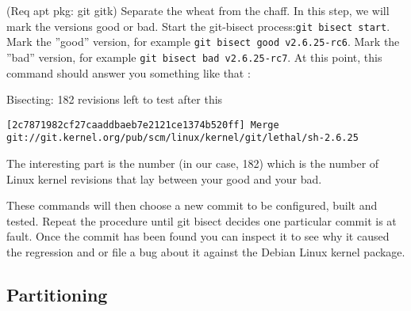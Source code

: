 \begin{itemize}
(Req apt pkg: git gitk)
Separate the wheat from the chaff. In this step, we will mark the versions good or bad.
Start the git-bisect process:\verb=git bisect start=.
Mark the ''good'' version, for example \verb=git bisect good v2.6.25-rc6=.
Mark the ''bad'' version, for example \verb=git bisect bad v2.6.25-rc7=.
At this point, this command should answer you something like that :

Bisecting: 182 revisions left to test after this
\begin{lstlisting}
[2c7871982cf27caaddbaeb7e2121ce1374b520ff] Merge git://git.kernel.org/pub/scm/linux/kernel/git/lethal/sh-2.6.25
\end{lstlisting}
The interesting part is the number (in our case, 182) which is the number of Linux kernel revisions that lay between your good and your bad.

These commands will then choose a new commit to be configured, built and tested. Repeat the procedure until git bisect decides one particular commit is at fault. Once the commit has been found you can inspect it to see why it caused the regression and or file a bug about it against the Debian Linux kernel package.

\end{itemize}

\subsection{Partitioning}

